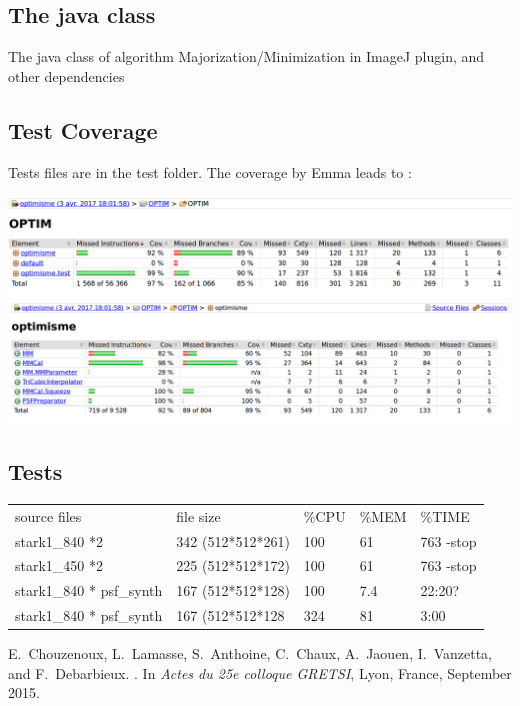 \documentclass[12pt, a4paper]{scrartcl}
\begin{document}
\subsection{The java class}
The java class of algorithm Majorization/Minimization
in ImageJ plugin, and other dependencies
\subsection{Test Coverage}
Tests files are in the test folder. The coverage by Emma leads to :

\begin{center}
\includegraphics[scale=0.28]{images/coverage1.png}
\includegraphics[scale=0.28]{images/coverage.png}
\end{center}


\subsection{Tests}
\begin{tabular}{lllll}
   source files   &       file size    &  \%CPU & \%MEM & \%TIME \\
   stark1\_840 *2 &  342 (512*512*261) &  100   & 61    & 763 -stop \\
   stark1\_450 *2 & 225 (512*512*172)  &  100   & 61    & 763 -stop\\
   stark1\_840 * psf\_synth & 167 (512*512*128) &  100  & 7.4  & 22:20? \\
   stark1\_840 * psf\_synth & 167 (512*512*128  & 324 & 81  & 3:00 \\
\end{tabular}


\begin{thebibliography}{2}

E.~Chouzenoux, L.~Lamasse, S.~Anthoine, C.~Chaux, A.~Jaouen, I.~Vanzetta, and
  F.~Debarbieux.
.
\newblock In {\em {Actes du 25e colloque GRETSI}}, Lyon, France, September
  2015.
\end{thebibliography}
\end{document}
